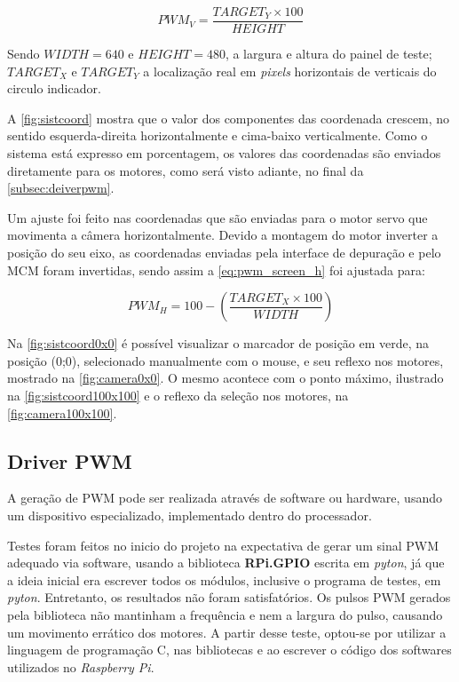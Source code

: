 \begin{equation}
	PWM_V = \frac{TARGET_Y \times 100}{HEIGHT}
	\label{eq:pwm_screen_v}
\end{equation}

Sendo $WIDTH = 640$ e $HEIGHT = 480$, a largura e altura do painel de teste; $TARGET_X$ e $TARGET_Y$ a localização real em \textit{pixels} horizontais de verticais do circulo indicador.

A \autoref{fig:sistcoord} mostra que o valor dos componentes das coordenada crescem, no sentido esquerda-direita horizontalmente e cima-baixo verticalmente. Como o sistema está expresso em porcentagem, os valores das coordenadas são enviados diretamente para os motores, como será visto adiante, no final da \autoref{subsec:deiverpwm}.\par

Um ajuste foi feito nas coordenadas que são enviadas para o motor servo que movimenta a câmera horizontalmente. Devido a montagem do motor inverter a posição do seu eixo, as coordenadas enviadas pela interface de depuração e pelo MCM foram invertidas, sendo assim a \autoref{eq:pwm_screen_h} foi ajustada para:

\begin{equation}
	PWM_H = 100 - (\frac{TARGET_X \times 100}{WIDTH})
	\label{eq:pwm_screen_h_inverse}
\end{equation}

Na \autoref{fig:sistcoord0x0} é possível visualizar o marcador de posição em verde, na posição (0;0), selecionado manualmente com o mouse, e seu reflexo nos motores, mostrado na \autoref{fig:camera0x0}. O mesmo acontece com o ponto máximo, ilustrado na \autoref{fig:sistcoord100x100} e o reflexo da seleção nos motores, na \autoref{fig:camera100x100}.\par

\subsection{Driver PWM}
\label{subsec:deiverpwm}

A geração de PWM pode ser realizada através de software ou hardware, usando um dispositivo especializado, implementado dentro do processador.\par

Testes foram feitos no inicio do projeto na expectativa de gerar um sinal PWM adequado via software, usando a biblioteca \textbf{RPi.GPIO} escrita em \textit{pyton}, já que a ideia inicial era escrever todos os módulos, inclusive o programa de testes, em \textit{pyton}. Entretanto, os resultados não foram satisfatórios. Os pulsos PWM gerados pela biblioteca não mantinham a frequência e nem a largura do pulso, causando um movimento errático dos motores. A partir desse teste, optou-se por utilizar a linguagem de programação C, nas bibliotecas e ao escrever o código dos softwares utilizados no \textit{Raspberry Pi}.\par

